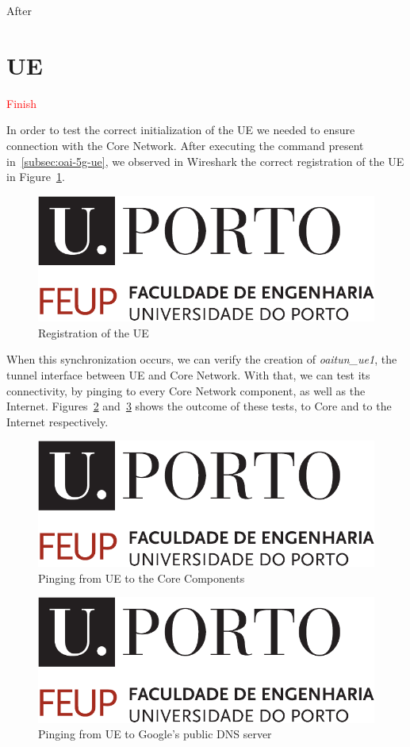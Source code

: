 After

\section{UE}\label{sec:ue}
\textcolor{red}{Finish}

In order to test the correct initialization of the UE we needed to ensure connection with the Core Network.
After executing the command present in~\ref{subsec:oai-5g-ue}, we observed in Wireshark the correct registration of the UE in Figure~\ref{fig:registration_ue}.

\begin{figure}[H]
    \centering
    \includegraphics[width=0.5\linewidth]{figures/uporto-feup}
    \caption{Registration of the UE}
    \label{fig:registration_ue}
\end{figure}

When this synchronization occurs, we can verify the creation of \textit{oaitun\_ue1}, the tunnel interface between UE and Core Network.
With that, we can test its connectivity, by pinging to every Core Network component, as well as the Internet.
Figures~\ref{fig:ping_ue_core} and~\ref{fig:ping_ue_internet} shows the outcome of these tests, to Core and to the Internet respectively.

\begin{figure}[H]
    \centering
    \includegraphics[width=0.5\linewidth]{figures/uporto-feup}
    \caption{Pinging from UE to the Core Components}
    \label{fig:ping_ue_core}
\end{figure}

\begin{figure}[H]
    \centering
    \includegraphics[width=0.5\linewidth]{figures/uporto-feup}
    \caption{Pinging from UE to Google's public DNS server}
    \label{fig:ping_ue_internet}
\end{figure}




